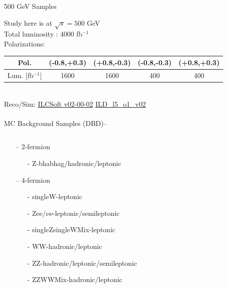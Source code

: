 \documentclass[10pt]{beamer}
\begin{document}
\begin{frame}{500 GeV Samples}

Study here is at $\sqrt{s} = 500$ GeV\\
Total luminosity : 4000 fb$^{-1}$\\
Polarizations:
\scriptsize
\begin{tabular}{|c|c|c|c|c|}
\hline 
Pol. &(-0.8,+0.3) & (+0.8,-0.3) & (-0.8,-0.3) & (+0.8,+0.3) \\ 
\hline 
Lum. [fb$^{-1}$] & 1600 & 1600 & 400 & 400 \\ 
\hline 
\end{tabular} 
\normalsize
\quad \quad \\
Reco/Sim: \quad \scriptsize
\url{ILCSoft v02-00-02} \quad
\url{ILD_l5_o1_v02}\\
\quad \quad \\
\normalsize
MC Background Samples (DBD)--\\

\begin{columns}
\begin{column}{0.5\textwidth}

\begin{itemize}

	\item[--] 2-fermion 
		\begin{itemize}
			\scriptsize
			\item[-] Z-bhabhag/hadronic/leptonic
		\end{itemize}
	\item[--] 4-fermion 
		\begin{itemize}
			\scriptsize
			\item[-] singleW-leptonic 
			\item[-]Zee/$\nu\nu$-leptonic/semileptonic 
			\item[-]singleZsingleWMix-leptonic 
			\item[-]WW-hadronic/leptonic
			\item[-]ZZ-hadronic/leptonic/semileptonic
			\item[-]ZZWWMix-hadronic/leptonic
		\end{itemize}
	

\end{itemize}


\end{column}
\end{columns}
\end{frame}
\end{document}
